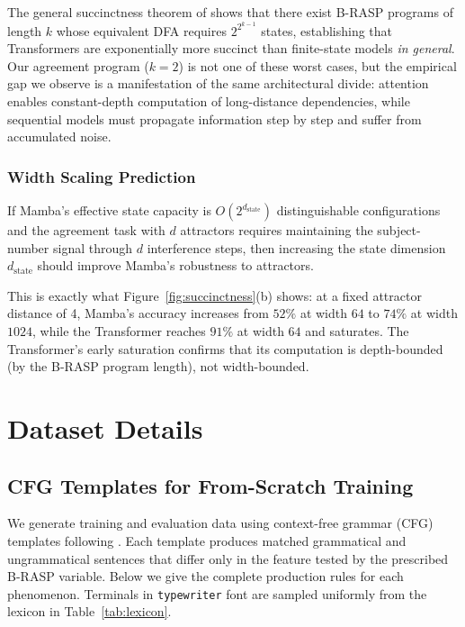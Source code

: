 \documentclass[11pt]{article}
\begin{document}
The general succinctness theorem of \citet{DBLP:journals/corr/abs-2510-19315} shows that there exist B-RASP programs of length $k$ whose equivalent DFA requires $2^{2^{k-1}}$ states, establishing that Transformers are exponentially more succinct than finite-state models \emph{in general}.
Our agreement program ($k = 2$) is not one of these worst cases, but the empirical gap we observe is a manifestation of the same architectural divide: attention enables constant-depth computation of long-distance dependencies, while sequential models must propagate information step by step and suffer from accumulated noise.

\subsubsection{Width Scaling Prediction}

If Mamba's effective state capacity is $O(2^{d_\mathrm{state}})$ distinguishable configurations and the agreement task with $d$ attractors requires maintaining the subject-number signal through $d$ interference steps, then increasing the state dimension $d_\mathrm{state}$ should improve Mamba's robustness to attractors.

This is exactly what Figure~\ref{fig:succinctness}(b) shows: at a fixed attractor distance of 4, Mamba's accuracy increases from $52\%$ at width $64$ to $74\%$ at width $1024$, while the Transformer reaches $91\%$ at width $64$ and saturates.
The Transformer's early saturation confirms that its computation is depth-bounded (by the B-RASP program length), not width-bounded.

\section{Dataset Details}
\label{app:data}

\subsection{CFG Templates for From-Scratch Training}
\label{app:cfg}

We generate training and evaluation data using context-free grammar (CFG) templates following \citet{marvin2018targeted}.
Each template produces matched grammatical and ungrammatical sentences that differ only in the feature tested by the prescribed B-RASP variable.
Below we give the complete production rules for each phenomenon.
Terminals in \texttt{typewriter} font are sampled uniformly from the lexicon in Table~\ref{tab:lexicon}.
\end{document}
